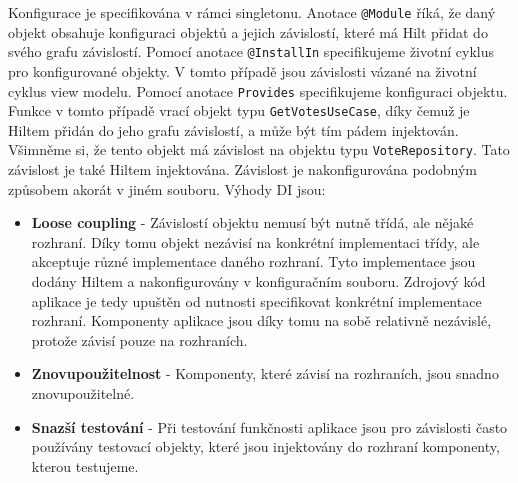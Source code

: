 \noindent Konfigurace je specifikována v rámci singletonu. Anotace \lstinline|@Module| říká, že daný objekt obsahuje konfiguraci objektů a jejich závislostí, které má Hilt přidat do svého grafu závislostí. Pomocí anotace \lstinline|@InstallIn| specifikujeme životní cyklus pro konfigurované objekty. V tomto případě jsou závislosti vázané na životní cyklus view modelu. Pomocí anotace \lstinline|Provides| specifikujeme konfiguraci objektu. Funkce v tomto případě vrací objekt typu \lstinline|GetVotesUseCase|, díky čemuž je Hiltem přidán do jeho grafu závislostí, a může být tím pádem injektován. Všimněme si, že tento objekt má závislost na objektu typu \lstinline|VoteRepository|. Tato závislost je také Hiltem injektována. Závislost je nakonfigurována podobným způsobem akorát v jiném souboru. Výhody DI jsou:

\begin{itemize}
	\item \textbf{Loose coupling} - Závislostí objektu nemusí být nutně třídá, ale nějaké rozhraní. Díky tomu objekt nezávisí na konkrétní implementaci třídy, ale akceptuje různé implementace daného rozhraní. Tyto implementace jsou dodány Hi\textit{}ltem a nakonfigurovány v konfiguračním souboru. Zdrojový kód aplikace je tedy upuštěn od nutnosti specifikovat konkrétní implementace rozhraní. Komponenty aplikace jsou díky tomu na sobě relativně nezávislé, protože závisí pouze na rozhraních. 
	
	\item \textbf{Znovupoužitelnost} - Komponenty, které závisí na rozhraních, jsou snadno znovupoužitelné.
	
	\item \textbf{Snazší testování} - Při testování funkčnosti aplikace jsou pro závislosti často používány testovací objekty, které jsou injektovány do rozhraní komponenty, kterou testujeme. 
\end{itemize}

